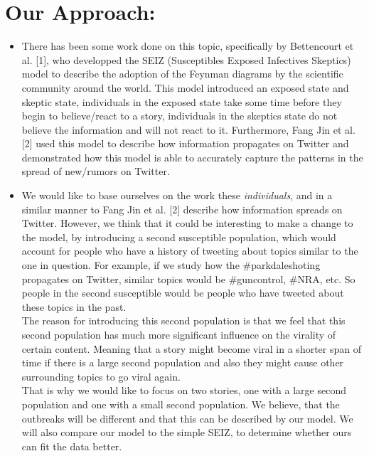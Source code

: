 \documentclass{article}
\begin{document}
\section{Our Approach:}
\begin{itemize}
\item There has been some work done on this topic, specifically by Bettencourt et al. [1], who developped the SEIZ (Susceptibles Exposed Infectives Skeptics) model to describe the adoption of the Feynman diagrams by the scientific community around the world. This model introduced an exposed state and skeptic state, individuals in the exposed state take some time before they begin to believe/react to a story, individuals in the skeptics state do not believe the information and will not react to it. Furthermore, Fang Jin et al. [2] used this model to describe how information propagates on Twitter and demonstrated how this model is able to accurately capture the patterns in the spread of new/rumors on Twitter. 
\item  We would like to base ourselves on the work these\textit{ individuals}, and in a similar manner to Fang Jin et al. [2] describe how information spreads on Twitter. However, we think that it could be interesting to make a change to the model, by introducing a second susceptible population, which would account for people who have a history of tweeting about topics similar to the one in question. For example, if we study how the \#parkdaleshoting propagates on Twitter, similar topics would be \#guncontrol, \#NRA, etc. So people in the second susceptible would be people who have tweeted about these topics in the past. \\
The reason for introducing this second population is that we feel that this second population has much more significant influence on the virality of certain content. Meaning that a story might become viral in a shorter span of time if there is a large second population and also they might cause other surrounding topics to go viral again. 
\\That is why we would like to focus on two stories, one with a large second population and one with a small second population. We believe, that the outbreaks will be different and that this can be described by our model. We will also compare our model to the simple SEIZ, to determine whether ours can fit the data better.


\end{itemize}
\end{document}
